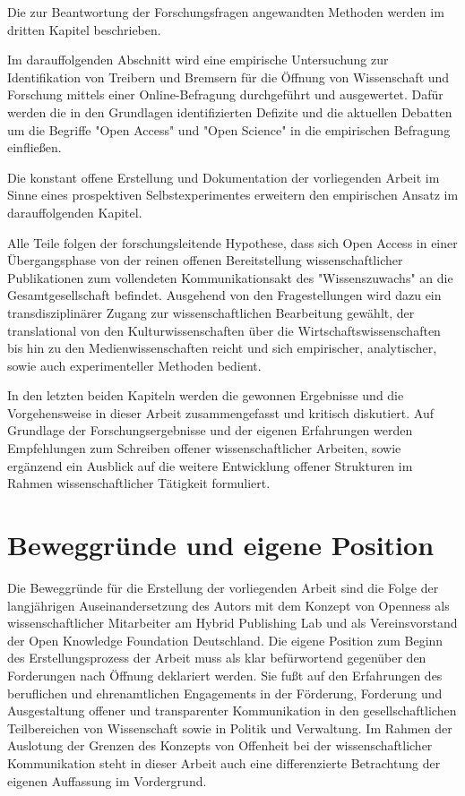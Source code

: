 Die zur Beantwortung der Forschungsfragen angewandten Methoden werden im dritten Kapitel beschrieben.

Im darauffolgenden Abschnitt wird eine empirische Untersuchung zur Identifikation von Treibern und Bremsern für die Öffnung von Wissenschaft und Forschung mittels einer Online-Befragung durchgeführt und ausgewertet. Dafür werden die in den Grundlagen identifizierten Defizite und die aktuellen Debatten um die Begriffe "Open Access" und "Open Science" in die empirischen Befragung einfließen.

Die konstant offene Erstellung und Dokumentation der vorliegenden Arbeit im Sinne eines prospektiven Selbstexperimentes erweitern den empirischen Ansatz im darauffolgenden Kapitel.

Alle Teile folgen der forschungsleitende Hypothese, dass sich Open Access in einer Übergangsphase von der reinen offenen Bereitstellung wissenschaftlicher Publikationen zum vollendeten Kommunikationsakt des "Wissenszuwachs" \cite{Luhmann1998} an die Gesamtgesellschaft befindet. Ausgehend von den Fragestellungen wird dazu ein transdisziplinärer Zugang zur wissenschaftlichen Bearbeitung gewählt, der translational von den Kulturwissenschaften über die Wirtschaftswissenschaften bis hin zu den Medienwissenschaften reicht und sich empirischer, analytischer, sowie auch experimenteller Methoden bedient.

In den letzten beiden Kapiteln werden die gewonnen Ergebnisse und die Vorgehensweise in dieser Arbeit zusammengefasst und kritisch diskutiert. Auf Grundlage der Forschungsergebnisse und der eigenen Erfahrungen werden Empfehlungen zum Schreiben offener wissenschaftlicher Arbeiten, sowie ergänzend ein Ausblick auf die weitere Entwicklung offener Strukturen im Rahmen wissenschaftlicher Tätigkeit formuliert.

\section{Beweggründe und eigene Position}

Die Beweggründe für die Erstellung der vorliegenden Arbeit sind die Folge der langjährigen Auseinandersetzung des Autors mit dem Konzept von Openness als wissenschaftlicher Mitarbeiter am Hybrid Publishing Lab und als Vereinsvorstand der Open Knowledge Foundation Deutschland. Die eigene Position zum Beginn des Erstellungsprozess der Arbeit muss als klar befürwortend gegenüber den Forderungen nach Öffnung deklariert werden. Sie fußt auf den Erfahrungen des beruflichen und ehrenamtlichen Engagements in der Förderung, Forderung und Ausgestaltung offener und transparenter Kommunikation in den gesellschaftlichen Teilbereichen von Wissenschaft sowie in Politik und Verwaltung. Im Rahmen der Auslotung der Grenzen des Konzepts von Offenheit bei der wissenschaftlicher Kommunikation steht in dieser Arbeit auch eine differenzierte Betrachtung der eigenen Auffassung im Vordergrund.

